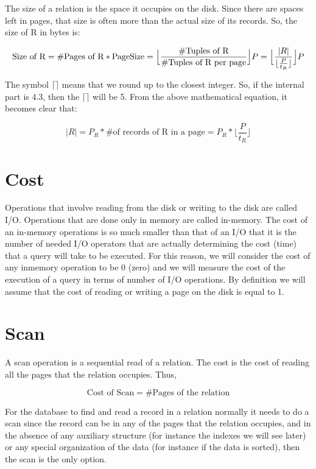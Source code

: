 \documentclass[12pt]{article}
\begin{document}
The size of a relation is the space it occupies on the disk. Since there are spaces left in pages, that size is often more than the actual size of its records. So, the size of R in bytes is:

$$
\text{Size of R} = \text{\#Pages of R} * \text{PageSize} = \Big\lfloor\frac{\text{\#Tuples of R}}{\text{\#Tuples of R per page}}\Big\rfloor P \\
= \Big\lfloor\frac{ |R| }{\lfloor\frac{P}{t_R}\rfloor}\Big\rfloor P
$$

The symbol $\lceil \rceil$	means that we round up to the closest integer. So, if the internal part is 4.3, then the $\lceil \rceil$ will be 5.
From the above mathematical equation, it becomes clear that:

$$
|R| = P_R * \#\text{of records of R in a page} = P_R * \Big\lfloor\frac{P}{t_R}\Big\rfloor
$$

\section{Cost}

Operations that involve reading from the disk or writing to the disk are called I/O. Operations that are done only in memory are called in-memory. The cost of an in-memory operations is so much smaller than that of an I/O that it is the number of needed I/O operators that are actually determining the cost (time) that a query will take to be executed. For this reason, we will consider the cost of any inmemory operation to be 0 (zero) and we will measure the cost of the execution of a query in terms of number of I/O operations. By definition we will assume that the cost of reading or writing a page on the disk is equal to 1.

\section{Scan}

A scan operation is a sequential read of a relation. The cost is the cost of reading all the pages that the relation occupies. Thus,

$$
\text{Cost of Scan} = \#\text{Pages of the relation}
$$

For the database to find and read a record in a relation normally it needs to do a scan since the record can be in any of the pages that the relation occupies, and in the absence of any auxiliary structure (for instance the indexes we will see later) or any special organization of the data (for instance if the data is sorted), then the scan is the only option.
\end{document}
